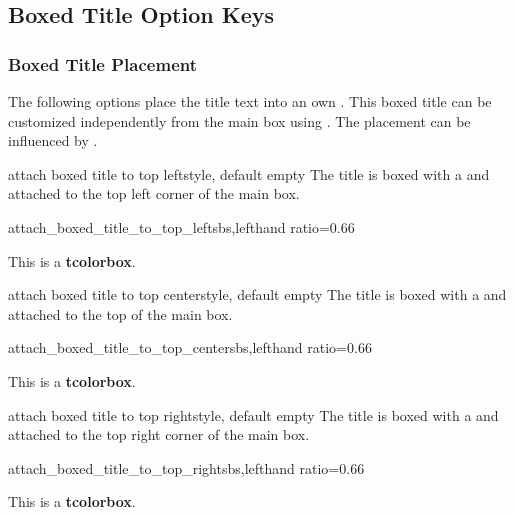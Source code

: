 \clearpage
\subsection{Boxed Title Option Keys}\label{subsec:skinboxedtitle}

\subsubsection{Boxed Title Placement}
The following options place the title text into an own .
This boxed title can be customized independently from the main box using
.
The placement can be influenced by .

\begin{docTcbKey}{attach boxed title to top left}{}{style, default empty}
The title is boxed with a  and attached to
the top left corner of the main box.
\begin{exdispExample*}{attach_boxed_title_to_top_left}{sbs,lefthand ratio=0.66}
\begin{tcolorbox}[enhanced,title=My title,
  attach boxed title to top left]
  This is a \textbf{tcolorbox}.
\end{tcolorbox}
\end{exdispExample*}
\end{docTcbKey}

\begin{docTcbKey}{attach boxed title to top center}{}{style, default empty}
The title is boxed with a  and attached to
the top of the main box.
\begin{exdispExample*}{attach_boxed_title_to_top_center}{sbs,lefthand ratio=0.66}
\begin{tcolorbox}[enhanced,title=My title,
  attach boxed title to top center]
  This is a \textbf{tcolorbox}.
\end{tcolorbox}
\end{exdispExample*}
\end{docTcbKey}

\begin{docTcbKey}{attach boxed title to top right}{}{style, default empty}
The title is boxed with a  and attached to
the top right corner of the main box.
\begin{exdispExample*}{attach_boxed_title_to_top_right}{sbs,lefthand ratio=0.66}
\begin{tcolorbox}[enhanced,title=My title,
  attach boxed title to top right]
  This is a \textbf{tcolorbox}.
\end{tcolorbox}
\end{exdispExample*}
\end{docTcbKey}

